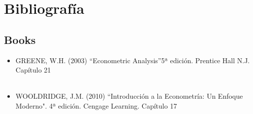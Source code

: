 \documentclass[11pt,fleqn]{book} %
\numberwithin{equation}{section} %
\numberwithin{figure}{section} %
\numberwithin{table}{section} %
\begin{document}

\chapter*{Bibliografía}
\section*{Books}
\printbibliography[heading=bibempty,type=book]

\begin{itemize}
	\item GREENE, W.H. (2003) “Econometric Analysis”5ª edición. Prentice Hall N.J. Capítulo 21
\\\\
    \item WOOLDRIDGE, J.M. (2010) “Introducción a la Econometría: Un Enfoque Moderno". 4ª edición. Cengage Learning. Capítulo 17

\end{itemize}



\cleardoublepage
{}
\setlength{\columnsep}{0.75cm}
\printindex

\end{document}
